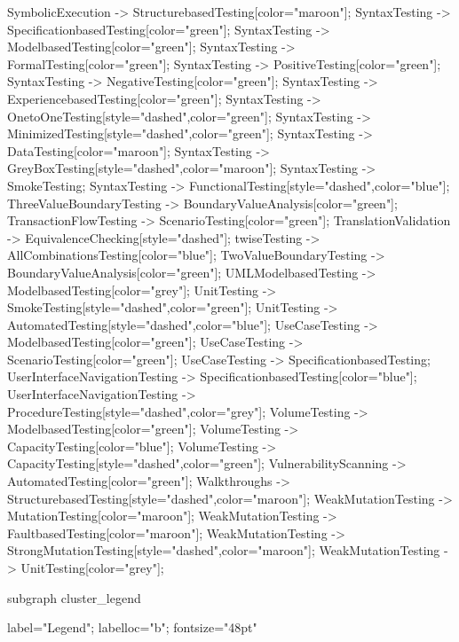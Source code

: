 \documentclass{article}
\begin{document}
{SymbolicExecution -> StructurebasedTesting[color="maroon"];
SyntaxTesting -> SpecificationbasedTesting[color="green"];
SyntaxTesting -> ModelbasedTesting[color="green"];
SyntaxTesting -> FormalTesting[color="green"];
SyntaxTesting -> PositiveTesting[color="green"];
SyntaxTesting -> NegativeTesting[color="green"];
SyntaxTesting -> ExperiencebasedTesting[color="green"];
SyntaxTesting -> OnetoOneTesting[style="dashed",color="green"];
SyntaxTesting -> MinimizedTesting[style="dashed",color="green"];
SyntaxTesting -> DataTesting[color="maroon"];
SyntaxTesting -> GreyBoxTesting[style="dashed",color="maroon"];
SyntaxTesting -> SmokeTesting;
SyntaxTesting -> FunctionalTesting[style="dashed",color="blue"];
ThreeValueBoundaryTesting -> BoundaryValueAnalysis[color="green"];
TransactionFlowTesting -> ScenarioTesting[color="green"];
TranslationValidation -> EquivalenceChecking[style="dashed"];
twiseTesting -> AllCombinationsTesting[color="blue"];
TwoValueBoundaryTesting -> BoundaryValueAnalysis[color="green"];
UMLModelbasedTesting -> ModelbasedTesting[color="grey"];
UnitTesting -> SmokeTesting[style="dashed",color="green"];
UnitTesting -> AutomatedTesting[style="dashed",color="blue"];
UseCaseTesting -> ModelbasedTesting[color="green"];
UseCaseTesting -> ScenarioTesting[color="green"];
UseCaseTesting -> SpecificationbasedTesting;
UserInterfaceNavigationTesting -> SpecificationbasedTesting[color="blue"];
UserInterfaceNavigationTesting -> ProcedureTesting[style="dashed",color="grey"];
VolumeTesting -> ModelbasedTesting[color="green"];
VolumeTesting -> CapacityTesting[color="blue"];
VolumeTesting -> CapacityTesting[style="dashed",color="green"];
VulnerabilityScanning -> AutomatedTesting[color="green"];
Walkthroughs -> StructurebasedTesting[style="dashed",color="maroon"];
WeakMutationTesting -> MutationTesting[color="maroon"];
WeakMutationTesting -> FaultbasedTesting[color="maroon"];
WeakMutationTesting -> StrongMutationTesting[style="dashed",color="maroon"];
WeakMutationTesting -> UnitTesting[color="grey"];

subgraph cluster_legend {

    label="Legend";
    labelloc="b";
    fontsize="48pt"

}}
\end{document}
